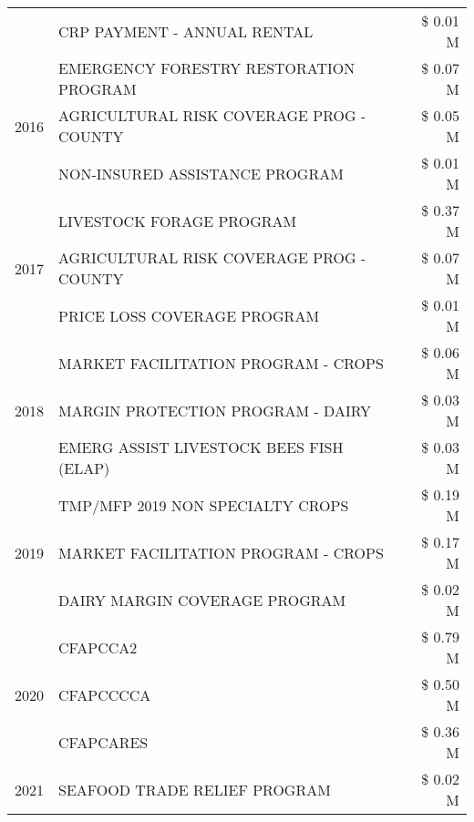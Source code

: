 \begin{tabular}{llr}
 & CRP PAYMENT - ANNUAL RENTAL & \$ 0.01 M \\
\cline{1-3}
\multirow[t]{3}{*}{2016} & EMERGENCY FORESTRY RESTORATION PROGRAM & \$ 0.07 M \\
 & AGRICULTURAL RISK COVERAGE PROG - COUNTY & \$ 0.05 M \\
 & NON-INSURED ASSISTANCE PROGRAM & \$ 0.01 M \\
\cline{1-3}
\multirow[t]{3}{*}{2017} & LIVESTOCK FORAGE PROGRAM & \$ 0.37 M \\
 & AGRICULTURAL RISK COVERAGE PROG - COUNTY & \$ 0.07 M \\
 & PRICE LOSS COVERAGE PROGRAM & \$ 0.01 M \\
\cline{1-3}
\multirow[t]{3}{*}{2018} & MARKET FACILITATION PROGRAM - CROPS & \$ 0.06 M \\
 & MARGIN PROTECTION PROGRAM - DAIRY & \$ 0.03 M \\
 & EMERG ASSIST LIVESTOCK BEES FISH (ELAP) & \$ 0.03 M \\
\cline{1-3}
\multirow[t]{3}{*}{2019} & TMP/MFP 2019 NON SPECIALTY CROPS & \$ 0.19 M \\
 & MARKET FACILITATION PROGRAM - CROPS & \$ 0.17 M \\
 & DAIRY MARGIN COVERAGE PROGRAM & \$ 0.02 M \\
\cline{1-3}
\multirow[t]{3}{*}{2020} & CFAPCCA2 & \$ 0.79 M \\
 & CFAPCCCCA & \$ 0.50 M \\
 & CFAPCARES & \$ 0.36 M \\
\cline{1-3}
2021 & SEAFOOD TRADE RELIEF PROGRAM & \$ 0.02 M \\
\cline{1-3}
\bottomrule
\end{tabular}
